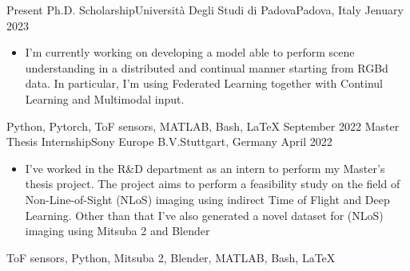 %
%
%
\begin{experiences}
    \experience
        {Present}            {Ph.D. Scholarship}{Università Degli Studi di Padova}{Padova, Italy}
        {Jenuary 2023}       {\begin{itemize}
                                 \item I'm currently working on developing a model able to perform scene understanding in a distributed and continual manner starting from RGBd data. In particular, I'm using Federated Learning together with Continul Learning and Multimodal input.
                             \end{itemize}
                            }
                            {Python, Pytorch, ToF sensors, MATLAB, Bash, \LaTeX}
    \experience
        {September 2022}    {Master Thesis Internship}{Sony Europe B.V.}{Stuttgart, Germany}
        {April 2022}        {\begin{itemize}
                                 \item I've worked in the R\&D department as an intern to perform my Master's thesis project. The project aims to perform a feasibility study on the field of Non-Line-of-Sight (NLoS) imaging using indirect Time of Flight and Deep Learning. Other than that I've also generated a novel dataset for (NLoS) imaging using Mitsuba 2 and Blender
                             \end{itemize}
                            }
                            {ToF sensors, Python, Mitsuba 2, Blender, MATLAB, Bash, \LaTeX}
                    
\end{experiences}
